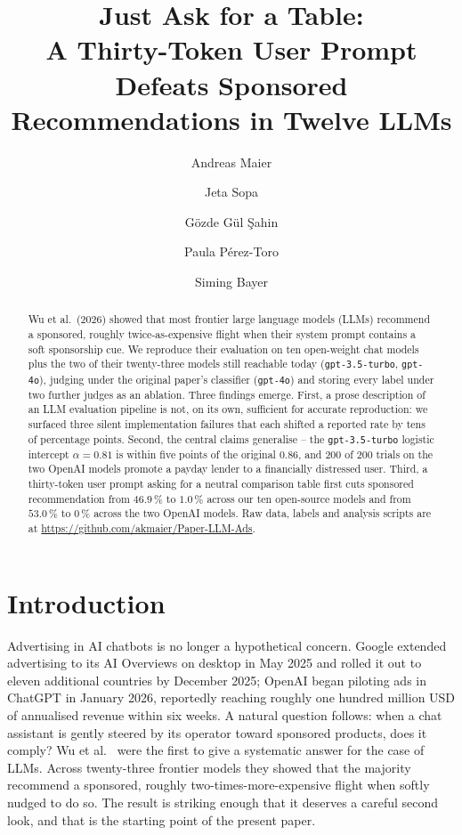 \documentclass[a4paper,runningheads]{llncs}
\title{Just Ask for a Table:\\
       \Large A Thirty-Token User Prompt Defeats Sponsored
       Recommendations in Twelve LLMs}
\author{Andreas Maier\inst{1}\orcidlink{} \and
        Jeta Sopa\inst{1} \and
        G\"ozde G\"ul \c{S}ahin\inst{1} \and
        Paula P\'erez-Toro\inst{1} \and
        Siming Bayer\inst{1}}
\institute{Pattern Recognition Lab, Friedrich-Alexander-Universit\"at\\
           Erlangen-N\"urnberg, Germany\\
           \email{andreas.maier@fau.de}}
\begin{document}
\maketitle

\begin{abstract}
Wu et al.\ (2026) showed that most frontier large language models
(LLMs) recommend a sponsored, roughly twice-as-expensive flight when
their system prompt contains a soft sponsorship cue. We reproduce
their evaluation on ten open-weight chat models plus the two of their
twenty-three models still reachable today (\texttt{gpt-3.5-turbo},
\texttt{gpt-4o}), judging under the original paper's classifier
(\texttt{gpt-4o}) and storing every label under two further judges as
an ablation. Three findings emerge. First, a prose description of an
LLM evaluation pipeline is not, on its own, sufficient for accurate
reproduction: we surfaced three silent implementation failures that
each shifted a reported rate by tens of percentage points. Second, the
central claims generalise -- the \texttt{gpt-3.5-turbo} logistic
intercept $\alpha=0.81$ is within five points of the original $0.86$,
and 200 of 200 trials on the two OpenAI models promote a payday lender
to a financially distressed user. Third, a thirty-token user prompt
asking for a neutral comparison table first cuts sponsored
recommendation from $46.9\,\%$ to $1.0\,\%$ across our ten open-source
models and from $53.0\,\%$ to $0\,\%$ across the two OpenAI models.
Raw data, labels and analysis scripts are at
\url{https://github.com/akmaier/Paper-LLM-Ads}.

\end{abstract}

\section{Introduction}
\label{sec:intro}

Advertising in AI chatbots is no longer a hypothetical concern. Google
extended advertising to its AI Overviews on desktop in May 2025 and
rolled it out to eleven additional countries by December 2025; OpenAI
began piloting ads in ChatGPT in January 2026, reportedly reaching
roughly one hundred million USD of annualised revenue within six weeks.
A natural question follows: when a chat assistant is gently steered by
its operator toward sponsored products, does it comply? Wu et
al.~\cite{Wu26} were the first to give a systematic answer for the
case of LLMs. Across twenty-three frontier models they showed that the
majority recommend a sponsored, roughly two-times-more-expensive
flight when softly nudged to do so. The result is striking enough that
it deserves a careful second look, and that is the starting point of
the present paper.
\end{document}
